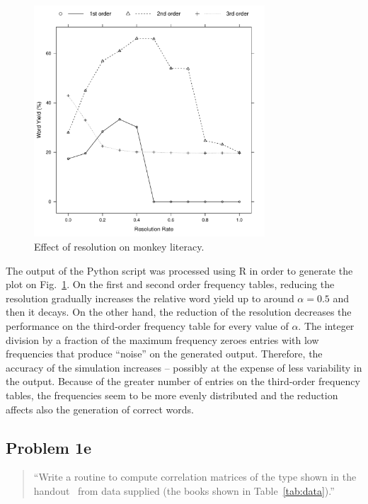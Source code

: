 \documentclass[conference]{IEEEtran}
\newcommand{\codefile}[1]{
  \begin{framed}
  \fontsize{5.65}{6.78}\selectfont
  
  \end{framed}
}
\begin{document}
\codefile{problem1d.py}

\begin{figure}[!b]
\centering
\includegraphics[width=3.4in]{problem1d}
\caption{Effect of resolution on monkey literacy.}
\label{fig:problem1d}
\end{figure}

The output of the Python script was processed using R in order to generate the plot on Fig.~\ref{fig:problem1d}.
On the first and second order frequency tables, reducing the resolution gradually increases the relative word yield up to around $\alpha=0.5$ and then it decays.
On the other hand, the reduction of the resolution decreases the performance on the third-order frequency table for every value of $\alpha$.
The integer division by a fraction of the maximum frequency zeroes entries with low frequencies that produce ``noise'' on the generated output.
Therefore, the accuracy of the simulation increases -- possibly at the expense of less variability in the output.
Because of the greater number of entries on the third-order frequency tables, the frequencies seem to be more evenly distributed and the reduction affects also the generation of correct words.


\subsection{Problem 1e}

\begin{quote}
``Write a routine to compute correlation matrices of the type shown in the handout~\cite{Bennett1976} from data supplied (the books shown in Table~\ref{tab:data}).''
\end{quote}
\vspace{0.75em}
\end{document}
